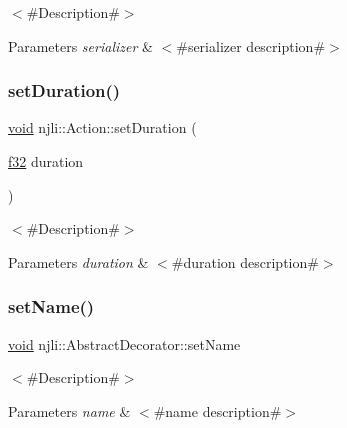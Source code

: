$<$\#\+Description\#$>$


\begin{DoxyParams}{Parameters}
{\em serializer} & $<$\#serializer description\#$>$ \\
\hline
\end{DoxyParams}
\mbox{\label{classnjli_1_1_action_a036937b57eea213ffeb977e3c22e51f6}} 
\subsubsection{\texorpdfstring{set\+Duration()}{setDuration()}}
{\footnotesize\ttfamily \mbox{\hyperlink{_thread_8h_af1e856da2e658414cb2456cb6f7ebc66}{void}} njli\+::\+Action\+::set\+Duration (\begin{DoxyParamCaption}\item[{\mbox{\hyperlink{_util_8h_a5f6906312a689f27d70e9d086649d3fd}{f32}}}]{duration }\end{DoxyParamCaption})}

$<$\#\+Description\#$>$


\begin{DoxyParams}{Parameters}
{\em duration} & $<$\#duration description\#$>$ \\
\hline
\end{DoxyParams}
\mbox{\label{classnjli_1_1_action_a087eb5f8d9f51cc476f12f1d10a3cb95}} 
\subsubsection{\texorpdfstring{set\+Name()}{setName()}}
{\footnotesize\ttfamily \mbox{\hyperlink{_thread_8h_af1e856da2e658414cb2456cb6f7ebc66}{void}} njli\+::\+Abstract\+Decorator\+::set\+Name}

$<$\#\+Description\#$>$


\begin{DoxyParams}{Parameters}
{\em name} & $<$\#name description\#$>$ \\
\hline
\end{DoxyParams}
\mbox{\label{classnjli_1_1_action_ac660ece5790dced62b28f6ec0199c1d7}} 
